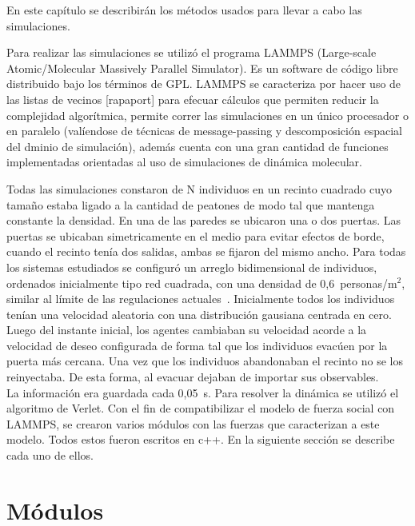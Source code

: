 
En este capítulo se describirán los métodos usados para llevar a cabo las simulaciones. 

Para realizar las simulaciones se utilizó el programa LAMMPS (Large-scale Atomic/Molecular Massively Parallel Simulator).
Es un software de código libre distribuido bajo los términos de GPL.
LAMMPS se caracteriza por hacer uso de las listas de vecinos [rapaport] para efecuar cálculos que permiten reducir la
complejidad algorítmica, permite correr las simulaciones en un único procesador o en paralelo (valíendose de técnicas de message-passing y descomposición espacial del dminio de simulación), además cuenta con una gran cantidad de funciones implementadas orientadas al uso de simulaciones de dinámica molecular. 

Todas las simulaciones constaron de N individuos en un recinto cuadrado cuyo tamaño estaba ligado a la cantidad de
peatones de modo tal que mantenga constante la densidad. En una de las paredes se ubicaron una o dos puertas. Las puertas se ubicaban simetricamente en el medio para evitar efectos de borde, cuando el recinto tenía dos salidas, ambas se fijaron del mismo ancho.
Para todas los sistemas estudiados se configuró un arreglo bidimensional de individuos, ordenados inicialmente tipo
red cuadrada, con una densidad de  0,6~personas/m$^2$, similar al límite de las regulaciones actuales~\cite{mysen}. Inicialmente todos los individuos tenían una velocidad aleatoria con una distribución gausiana centrada en cero.  Luego del instante inicial, los agentes cambiaban su velocidad acorde a la velocidad de deseo configurada 
de forma tal que los individuos evacúen por la puerta más cercana. Una vez que los individuos abandonaban el recinto no se los reinyectaba. De esta forma, al evacuar dejaban de importar sus observables. \\
La información era guardada cada 0,05~s. 
Para resolver la dinámica se utilizó el algoritmo de Verlet. 
Con el fin de compatibilizar el modelo de fuerza social con LAMMPS, se crearon varios módulos con las fuerzas que
caracterizan a este modelo. Todos estos fueron escritos en c++. En la siguiente sección se describe cada uno de ellos. 
%

\section{Módulos}

